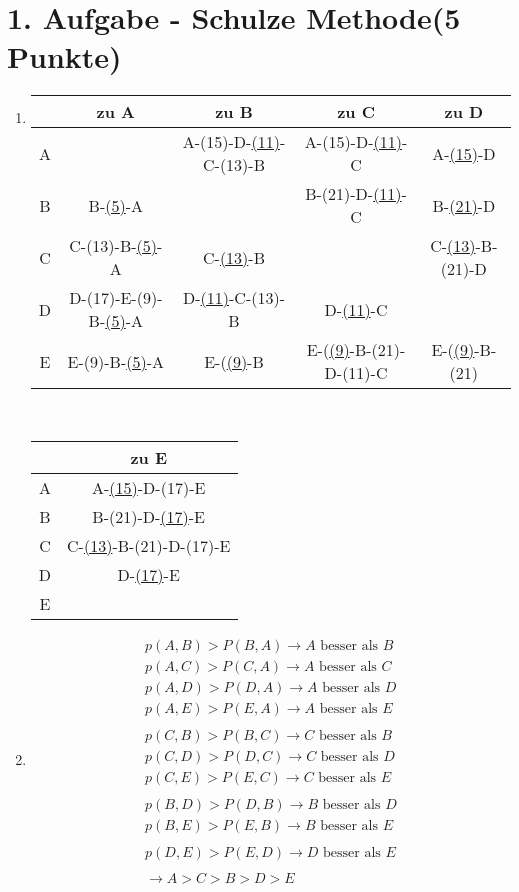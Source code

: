 \documentclass[a4paper, 11pt]{article}
\begin{document}
\section*{1. Aufgabe - Schulze Methode\hfill {\small (5 Punkte)}}
\begin{enumerate}
\item
\begin{tabular}{c || c|c|c|c}
& zu A & zu B & zu C & zu D \\ \hline
A & & A-(15)-D-\underline{(11)}-C-(13)-B & A-(15)-D-\underline{(11)}-C & A-\underline{(15)}-D \\
B & B-\underline{(5)}-A & & B-(21)-D-\underline{(11)}-C  & B-\underline{(21)}-D \\
C & C-(13)-B-\underline{(5)}-A & C-\underline{(13)}-B & & C-\underline{(13)}-B-(21)-D \\
D & D-(17)-E-(9)-B-\underline{(5)}-A & D-\underline{(11)}-C-(13)-B & D-\underline{(11)}-C & \\
E & E-(9)-B-\underline{(5)}-A & E-(\underline{(9)}-B & E-(\underline{(9)}-B-(21)-D-(11)-C & E-(\underline{(9)}-B-(21)


\end{tabular}\\
\begin{tabular}{c || c}
& zu E\\ \hline
A & A-\underline{(15)}-D-(17)-E\\
B  & B-(21)-D-\underline{(17)}-E\\
C & C-\underline{(13)}-B-(21)-D-(17)-E\\
D & D-\underline{(17)}-E\\
E &


\end{tabular}

\item 
\begin{align*}
p(A,B) > P(B,A) \rightarrow A \text{ besser als } B \\
p(A,C) > P(C,A) \rightarrow A \text{ besser als } C \\
p(A,D) > P(D,A) \rightarrow A \text{ besser als } D \\
p(A,E) > P(E,A) \rightarrow A \text{ besser als } E \\
\\
p(C,B) > P(B,C) \rightarrow C \text{ besser als } B \\
p(C,D) > P(D,C) \rightarrow C \text{ besser als } D \\
p(C,E) > P(E,C) \rightarrow C \text{ besser als } E \\
\\
p(B,D) > P(D,B) \rightarrow B \text{ besser als } D \\
p(B,E) > P(E,B) \rightarrow B \text{ besser als } E \\
\\
p(D,E) > P(E,D) \rightarrow D \text{ besser als } E \\
\\
\rightarrow A > C > B > D > E
\end{align*}
\end{enumerate}
\end{document}
